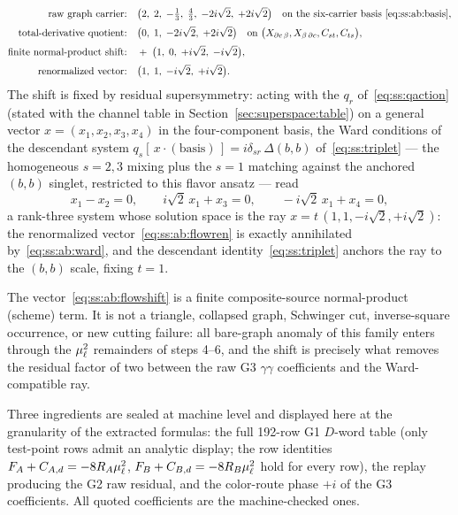 \begin{align}
\text{raw graph carrier:}\quad
&\bigl(2,\;2,\;-\tfrac13,\;\tfrac43,\;-2i\sqrt2,\;+2i\sqrt2\bigr)
\quad\text{on the six-carrier basis }\eqref{eq:ss:ab:basis},
\label{eq:ss:ab:flowraw}\\[2pt]
\text{total-derivative quotient:}\quad
&\bigl(0,\;1,\;-2i\sqrt2,\;+2i\sqrt2\bigr)
\quad\text{on }
\bigl(X_{\partial c\,\beta},X_{\beta\,\partial c},C_{st},C_{ts}\bigr),
\label{eq:ss:ab:flowtd}\\[2pt]
\text{finite normal-product shift:}\quad
&+\;\bigl(1,\;0,\;+i\sqrt2,\;-i\sqrt2\bigr),
\label{eq:ss:ab:flowshift}\\[2pt]
\text{renormalized vector:}\quad
&\bigl(1,\;1,\;-i\sqrt2,\;+i\sqrt2\bigr) .
\label{eq:ss:ab:flowren}
\end{align}
The shift is fixed by residual supersymmetry: acting with the $q_r$ of~\eqref{eq:ss:qaction} (stated with the channel table in Section~\ref{sec:superspace:table}) on a general vector $x=(x_1,x_2,x_3,x_4)$ in the four-component basis, the Ward conditions of the descendant system $q_s[\,x\cdot(\text{basis})\,]=i\delta_{sr}\,\Delta(b,b)$ of~\eqref{eq:ss:triplet} --- the homogeneous $s=2,3$ mixing plus the $s=1$ matching against the anchored $(b,b)$ singlet, restricted to this flavor ansatz --- read
\begin{equation}\label{eq:ss:ab:ward}
x_1-x_2=0,
\qquad
i\sqrt2\,x_1+x_3=0,
\qquad
-i\sqrt2\,x_1+x_4=0 ,
\end{equation}
a rank-three system whose solution space is the ray $x=t\,(1,1,-i\sqrt2,+i\sqrt2)$: the renormalized vector~\eqref{eq:ss:ab:flowren} is exactly annihilated by~\eqref{eq:ss:ab:ward}, and the descendant identity~\eqref{eq:ss:triplet} anchors the ray to the $(b,b)$ scale, fixing $t=1$.

\begin{remark}%
\label{rem:ss:ab:shift}
The vector~\eqref{eq:ss:ab:flowshift} is a finite composite-source normal-product (scheme) term. It is not a triangle, collapsed graph, Schwinger cut, inverse-square occurrence, or new cutting failure: all bare-graph anomaly of this family enters through the $\mu_\ell^{2}$ remainders of steps 4--6, and the shift is precisely what removes the residual factor of two between the raw G3 $\gamma\gamma$ coefficients and the Ward-compatible ray.
\end{remark}

\begin{remark}\label{rem:ss:ab:machine}
Three ingredients are sealed at machine level and displayed here at the granularity of the extracted formulas: the full 192-row G1 $D$-word table (only test-point rows admit an analytic display; the row identities $F_A+C_{A,d}=-8R_A\mu_\ell^{2}$, $F_B+C_{B,d}=-8R_B\mu_\ell^{2}$ hold for every row), the replay producing the G2 raw residual, and the color-route phase $+i$ of the G3 coefficients. All quoted coefficients are the machine-checked ones.
\end{remark}

